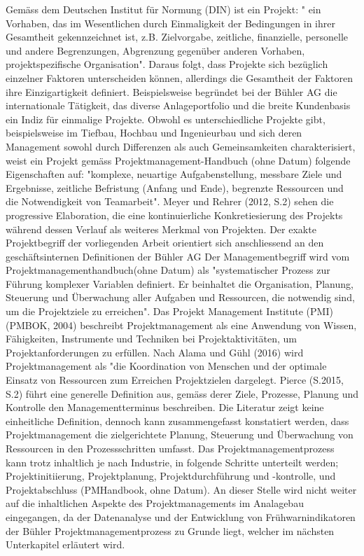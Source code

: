 Gemäss dem Deutschen Institut für Normung (DIN) ist ein Projekt: " ein Vorhaben, das im Wesentlichen durch Einmaligkeit der Bedingungen in ihrer Gesamtheit gekennzeichnet ist, z.B. Zielvorgabe, zeitliche, finanzielle, personelle und andere Begrenzungen, Abgrenzung gegenüber anderen Vorhaben, projektspezifische Organisation". Daraus folgt, dass Projekte sich bezüglich einzelner Faktoren unterscheiden können, allerdings die Gesamtheit der Faktoren ihre Einzigartigkeit definiert. Beispielsweise begründet bei der Bühler AG die internationale Tätigkeit, das diverse Anlageportfolio und die breite Kundenbasis ein Indiz für einmalige Projekte. Obwohl es unterschiedliche Projekte gibt, beispielsweise im Tiefbau, Hochbau und Ingenieurbau und sich deren Management sowohl durch Differenzen als auch Gemeinsamkeiten charakterisiert, weist ein Projekt gemäss Projektmanagement-Handbuch (ohne Datum) folgende Eigenschaften auf: "komplexe, neuartige Aufgabenstellung, messbare Ziele und Ergebnisse, zeitliche Befristung (Anfang und Ende), begrenzte Ressourcen und die Notwendigkeit von Teamarbeit". Meyer und Rehrer (2012, S.2) sehen die progressive Elaboration, die eine kontinuierliche Konkretiesierung des Projekts während dessen Verlauf als weiteres Merkmal von Projekten. Der exakte Projektbegriff der vorliegenden Arbeit orientiert sich anschliessend an den geschäftsinternen Definitionen der Bühler AG
\newline
Der Managementbegriff wird vom Projektmanagementhandbuch(ohne Datum) als "systematischer Prozess zur Führung komplexer Variablen definiert. Er beinhaltet die Organisation, Planung, Steuerung und Überwachung aller Aufgaben und Ressourcen, die notwendig sind, um die Projektziele zu erreichen". Das Projekt Management Institute (PMI) (PMBOK, 2004) beschreibt Projektmanagement als eine Anwendung von Wissen, Fähigkeiten, Instrumente und Techniken bei Projektaktivitäten, um Projektanforderungen zu erfüllen. Nach Alama und Gühl (2016) wird Projektmanagement als "die Koordination von Menschen und der optimale Einsatz von Ressourcen zum Erreichen Projektzielen dargelegt. Pierce (S.2015, S.2) führt eine generelle Definition aus, gemäss derer Ziele, Prozesse, Planung und Kontrolle den Managementterminus beschreiben. Die Literatur zeigt keine einheitliche Definition, dennoch kann zusammengefasst konstatiert werden, dass Projektmanagement die zielgerichtete Planung, Steuerung und Überwachung von  Ressourcen in den Prozessschritten umfasst. Das Projektmanagementprozess kann trotz inhaltlich je nach Industrie, in folgende Schritte unterteilt werden; Projektinitiierung, Projektplanung, Projektdurchführung und -kontrolle, und Projektabschluss (PMHandbook, ohne Datum). An dieser Stelle wird nicht weiter auf die inhaltlichen Aspekte des Projektmanagements im Analagebau eingegangen, da der Datenanalyse und der Entwicklung von Frühwarnindikatoren der Bühler Projektmanagementprozess zu Grunde liegt, welcher im nächsten Unterkapitel erläutert wird.
